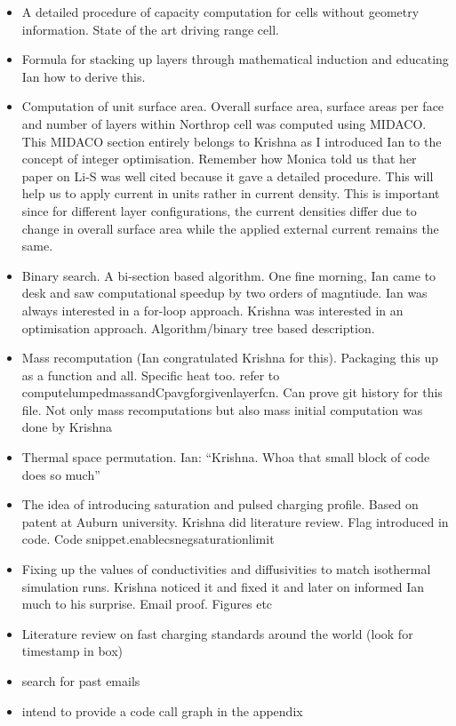 \begin{itemize}
    \item A detailed procedure of capacity computation for cells without geometry information. State of the art driving range cell.
    \item Formula for stacking up layers through mathematical induction and educating Ian how to derive this.
    \item Computation of unit surface area. Overall surface area, surface areas per face and number of layers within Northrop cell was computed using MIDACO. This MIDACO section entirely belongs to Krishna as I introduced Ian to the concept of integer optimisation. Remember how Monica told us that her paper on Li-S was well cited because it gave a detailed procedure. This will help us to apply current in units rather in current density. This is important since for different layer configurations, the current densities differ due to change in overall surface area while the applied external current remains the same.
    \item Binary search. A bi-section based algorithm. One fine morning, Ian came to desk and saw computational speedup by two orders of magntiude. Ian was always interested in a for-loop approach. Krishna was interested in an optimisation approach. Algorithm/binary tree based description.
    \item Mass recomputation (Ian congratulated Krishna for this). Packaging this up as a function and all. Specific heat too. refer to computelumpedmassandCpavgforgivenlayerfcn. Can prove git history for this file. Not only mass recomputations but also mass initial computation was done by Krishna
    \item Thermal space permutation. Ian: ``Krishna. Whoa that small block of code does so much''
    \item The idea of introducing saturation and pulsed charging profile. Based on patent at Auburn university. Krishna did literature review. Flag introduced in code. Code snippet.enablecsnegsaturationlimit
    \item Fixing up the values of conductivities and diffusivities to match isothermal simulation runs. Krishna noticed it and fixed it and later on informed Ian much to his surprise. Email proof. Figures etc
    \item Literature review on fast charging standards around the world (look for timestamp in box)
    \item search for past emails
    \item intend to provide a code call graph in the appendix

\end{itemize}
